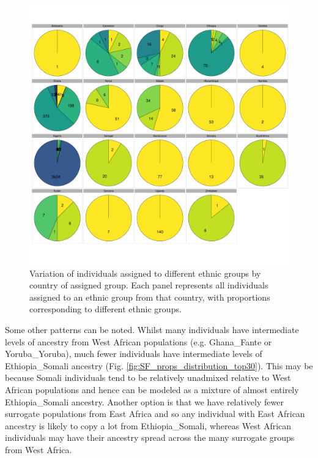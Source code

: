 \begin{figure}[htp]
    \centering
    \includegraphics[width=1.0\textwidth]{../images/chapter3/all_countries_SF_props_pie_chart.pdf}
    \caption{Variation of individuals assigned to different ethnic groups by country of assigned group. Each panel represents all individuals assigned to an ethnic group from that country, with proportions corresponding to different ethnic groups. }
    \label{fig:all_countries_SF_props_pie_chart}
\end{figure}


Some other patterns can be noted. Whilst many individuals have intermediate levels of ancestry from West African populations (e.g. Ghana\_Fante or Yoruba\_Yoruba), much fewer individuals have intermediate levels of Ethiopia\_Somali ancestry (Fig. \ref{fig:SF_props_distribution_top30}). This may be because Somali individuals tend to be relatively unadmixed relative to West African populations and hence can be modeled as a mixture of almost entirely Ethiopia\_Somali ancestry. Another option is that we have relatively fewer surrogate populations from East Africa and so any individual with East African ancestry is likely to copy a lot from Ethiopia\_Somali, whereas West African individuals may have their ancestry spread across the many surrogate groups from West Africa. 

